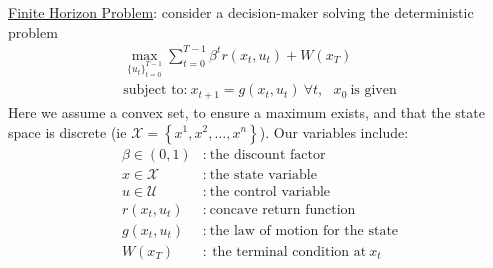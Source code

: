 \documentclass{article}
\begin{document}
\par \underline{Finite Horizon Problem}: consider a decision-maker solving the deterministic problem
\begin{gather*}
    \max_{\{ u_{t} \} _{t=0}^{T−1}} \sum_{t=0}^{T-1} \beta^{t}r(x_{t},u_{t}) + W(x_{T}) \\ \text{subject to:} \ x_{t+1} = g(x_{t}, u_{t}) \ \forall t, \ \ \ x_{0} \ \text{is given}
\end{gather*}
Here we assume a convex set, to ensure a maximum exists, and that the state space is discrete (ie $\mathcal{X} = \left\{x^{1}, x^{2}, \dots, x^{n}\right\}$). Our variables include:
\begin{align*}
\beta \in (0,1)&: \ \text{the discount factor} \\
x \in \mathcal{X}&:\ \text{the state variable} \\
u \in \mathcal{U}&:\ \text{the control variable} \\
r(x_{t},u_{t})&: \ \text{concave return function} \\
g(x_{t}, u_{t})&: \ \text{the law of motion for the state} \\
W(x_{T})&: \ \text{the terminal condition at} \ x_{t}
\end{align*}
\end{document}
